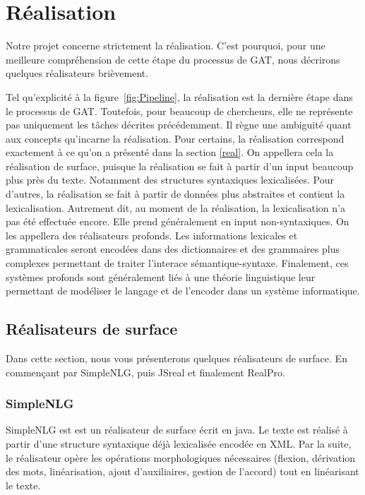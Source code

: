 

\section{Réalisation}

Notre projet concerne strictement la réalisation. C'est pourquoi, pour une meilleure compréhension de cette étape du processus de \ac{GAT}, nous décrirons quelques réalisateurs brièvement.

Tel qu'explicité à la figure~\ref{fig:Pipeline}, la réalisation est la dernière étape dans le processus de \ac{GAT}. Toutefois, pour beaucoup de chercheurs, elle ne représente pas uniquement les tâches décrites précédemment. Il règne une ambiguité quant aux concepts qu'incarne la réalisation. Pour certains, la réalisation correspond exactement à ce qu'on a présenté dans la section \ref{real}. On appellera cela la réalisation de surface, puisque la réalisation se fait à partir d'un input beaucoup plus près du texte. Notamment des structures syntaxiques lexicalisées. Pour d'autres, la réalisation se fait à partir de données plus abstraites et contient la lexicalisation. Autrement dit, au moment de la réalisation, la lexicalisation n'a pas été effectuée encore. Elle prend généralement en input non-syntaxiques. On les appellera des réalisateurs profonds. Les informations lexicales et grammaticales seront encodées dans des dictionnaires et des grammaires plus complexes permettant de traiter l'interace sémantique-syntaxe. Finalement, ces systèmes profonds sont généralement liés à une théorie linguistique leur permettant de modéliser le langage et de l'encoder dans un système informatique.


\subsection{Réalisateurs de surface}

Dans cette section, nous vous présenterons quelques réalisateurs de surface. En commençant par SimpleNLG, puis JSreal et finalement RealPro.

\subsubsection{SimpleNLG}
SimpleNLG est \citep{GattSimpleNLGRealisationEngine2009} est un réalisateur de surface écrit en java. Le texte est réalisé à partir d'une structure syntaxique déjà lexicalisée encodée en XML. Par la suite, le réalisateur opère les opérations morphologiques nécessaires (flexion, dérivation des mots, linéarisation, ajout d'auxiliaires, gestion de l'accord) tout en linéarisant le texte.

